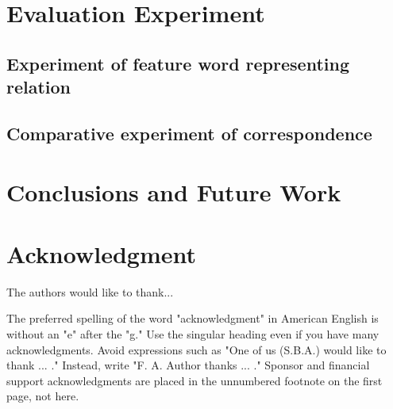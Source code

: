 \documentclass[journal]{IAENGtran}
\begin{document}
\section{Evaluation Experiment}
\label{sec:Evaluation Experiment}
\subsection{Experiment of feature word representing relation}
\label{subsec:Experiment of feature word representing relation}



\subsection{Comparative experiment of correspondence}
\label{subsec:Comparative experiment of correspondence}



\section{Conclusions and Future Work}
\label{sec:Conclusions and Future Work}


\section*{Acknowledgment}


The authors would like to thank...

The preferred spelling of the word "acknowledgment" in American
English is without an "e" after the "g." Use the singular heading
even if you have many acknowledgments. Avoid expressions such as
"One of us (S.B.A.) would like to thank ... ." Instead, write "F. A.
Author thanks ... ." Sponsor and financial support acknowledgments
are placed in the unnumbered footnote on the first page, not here.


\ifCLASSOPTIONcaptionsoff
  \newpage
\fi



\end{document}

